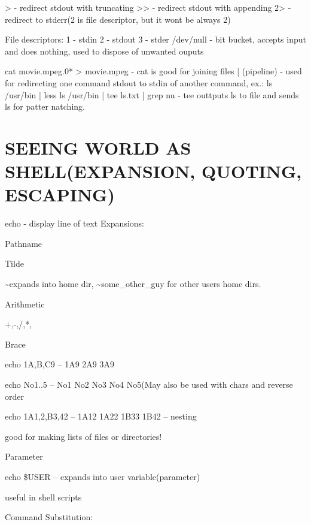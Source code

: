 \documentclass[8pt]{extarticle}
\begin{document}
\begin{multicols}{2}
> - redirect stdout with truncating
>> - redirect stdout with appending
2> - redirect to stderr(2 is file descriptor, but it wont be always 2)

File descriptors:
1 - stdin
2 - stdout
3 - stder
/dev/null - bit bucket, accepts input and does nothing, used to dispose of unwanted ouputs

cat movie.mpeg.0* > movie.mpeg - cat is good for joining files
| (pipeline) - used for redirecting one command stdout to stdin of another command, ex.: ls /usr/bin | less
ls /usr/bin | tee ls.txt | grep nu - tee outtputs ls to file and sends ls for patter natching.

\section{SEEING WORLD AS SHELL(EXPANSION, QUOTING, ESCAPING)}

echo - display line of text
Expansions:

Pathname



Tilde

\textasciitilde expands into home dir, \textasciitilde some\_other\_guy for other users home dirs.

Arithmetic

+,-,/,*,%




Brace

echo 1{A,B,C}9 – 1A9 2A9 3A9

echo No{1..5} – No1 No2 No3 No4 No5(May also be used with chars and reverse order

echo 1{A{1,2},B{3,4}}2 – 1A12 1A22 1B33 1B42 – nesting

good for making lists of files or directories!

Parameter

echo \$USER – expands into user variable(parameter)

useful in shell scripts

Command Substitution:


\end{multicols}
\end{document}
